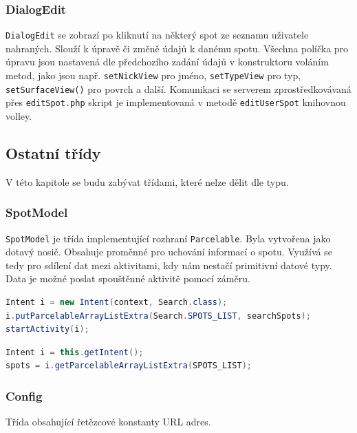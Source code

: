 \documentclass[12pt]{article}
\begin{document}
\subsubsection{DialogEdit}
\verb+DialogEdit+ se zobrazí po kliknutí na některý spot ze seznamu uživatele nahraných. Slouží k úpravě či změně údajů k danému spotu. Všechna políčka pro úpravu jsou nastavená dle předchozího zadání údajů v konstruktoru voláním metod, jako jsou např. \verb+setNickView+ pro jméno, \verb+setTypeView+ pro typ, \verb+setSurfaceView()+ pro povrch a další. Komunikaci se serverem zprostředkovávaná přes \verb+editSpot.php+ skript je implementovaná v metodě \verb+editUserSpot+ knihovnou volley.
\subsection{Ostatní třídy}
V této kapitole se budu zabývat třídami, které nelze dělit dle typu.
\subsubsection{SpotModel}
\verb+SpotModel+ je třída implementující rozhraní \verb+Parcelable+. Byla vytvořena jako dotavý nosič. Obsahuje proměnné pro uchování informací o spotu. Využívá se tedy pro sdílení dat mezi aktivitami, kdy nám nestačí primitivní datové typy. Data je možné poslat spouštěnné aktivitě pomocí záměru.
\begin{lstlisting}[language=Java,
title=Následujícím kódem použitý v aplikaci se spustí aktivita \lstinline!Search! se seznamem objektů \lstinline!SpotModel!.,
basicstyle=\ttfamily\small\color{black},
commentstyle=\itshape,
keywordstyle=\color{Blue},
showstringspaces=false,
frame=lines,
backgroundcolor=\color{lightGrey}
]
Intent i = new Intent(context, Search.class);
i.putParcelableArrayListExtra(Search.SPOTS_LIST, searchSpots);
startActivity(i);
\end{lstlisting}

\begin{lstlisting}[language=Java,
title=Tímto kódem naopak předaný seznam získáme zpět.,
basicstyle=\ttfamily\small\color{black},
commentstyle=\itshape,
keywordstyle=\color{Blue},
showstringspaces=false,
frame=lines,
backgroundcolor=\color{lightGrey}
]
Intent i = this.getIntent();
spots = i.getParcelableArrayListExtra(SPOTS_LIST);
\end{lstlisting}
\subsubsection{Config}
Třída obsahující řetězcové konstanty URL adres.
\end{document}
